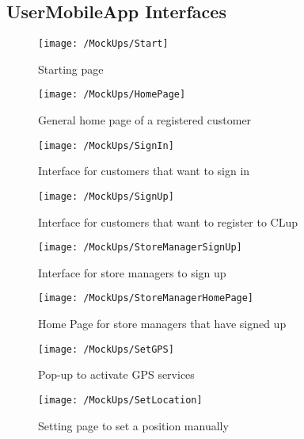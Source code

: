 \subsection {UserMobileApp Interfaces}
\begin{figure}[H]
	\centering
	\texttt{[image: /MockUps/Start]}
	\caption{Starting page}
\end{figure}

\begin{figure}[H]
	\centering
	\texttt{[image: /MockUps/HomePage]}
	\caption{General home page of a registered customer}
\end{figure}

\newpage

\begin{figure}[H]
	\centering
	\texttt{[image: /MockUps/SignIn]}
	\caption{Interface for customers that want to sign in}
\end{figure}

\begin{figure}[H]
	\centering
	\texttt{[image: /MockUps/SignUp]}
	\caption{Interface for customers that want to register to CLup}
\end{figure}

\newpage

\begin{figure}[H]
	\centering
	\texttt{[image: /MockUps/StoreManagerSignUp]}
	\caption{Interface for store managers to sign up}
\end{figure}

\begin{figure}[H]
	\centering
	\texttt{[image: /MockUps/StoreManagerHomePage]}
	\caption{Home Page for store managers that have signed up}
\end{figure}

\newpage

\begin{figure}[H]
	\centering
	\texttt{[image: /MockUps/SetGPS]}
	\caption{Pop-up to activate GPS services}
\end{figure}

\begin{figure}[H]
	\centering
	\texttt{[image: /MockUps/SetLocation]}
	\caption{Setting page to set a position manually}
\end{figure}

\newpage

